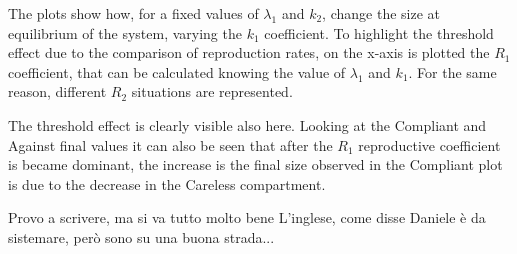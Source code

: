 The plots show how, for a fixed values of $\lambda_1$ and $k_2$, change the size at equilibrium of the system, varying the $k_1$ coefficient. To highlight the threshold effect due to the comparison of reproduction rates, on the x-axis is plotted the $R_1$  coefficient, that can be calculated knowing the value of  $\lambda_1$ and $k_1$. For the same reason, different $R_2$ situations are represented. 

The threshold effect is clearly visible also here. Looking at the Compliant and Against final values it can also be seen that after the $R_1$ reproductive coefficient is became dominant, the  increase is the final size observed in the Compliant plot is due to the decrease in the Careless compartment. 

Provo a scrivere, ma si va tutto molto bene
L'inglese, come disse Daniele è da sistemare, però sono su una buona strada...